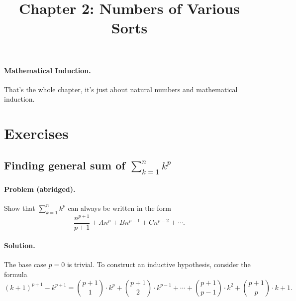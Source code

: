 \documentclass{article}
\begin{document}
\title{Chapter 2: Numbers of Various Sorts}
\maketitle

\paragraph{Mathematical Induction.} That's the whole chapter, it's just about
natural numbers and mathematical induction.

\section{Exercises}

\setcounter{subsection}{6}
\subsection{Finding general sum of $\sum^n_{k=1} k^p$}

\paragraph{Problem (abridged).} Show that $\sum^n_{k=1} k^p$ can always be
written in the form \begin{equation*}
  \frac{n^{p+1}}{p + 1} + An^p + Bn^{p-1} + Cn^{p-2} + \cdots.
\end{equation*}

\paragraph{Solution.} The base case $p = 0$ is trivial. To construct an
inductive hypothesis, consider the formula \begin{equation*}
  (k + 1)^{p+1} - k^{p+1} = \binom{p+1}{1} \cdot k^p + \binom{p+1}{2} \cdot
  k^{p-1} + \cdots + \binom{p+1}{p-1} \cdot k^2 + \binom{p+1}{p} \cdot k + 1.
\end{equation*}
\end{document}
